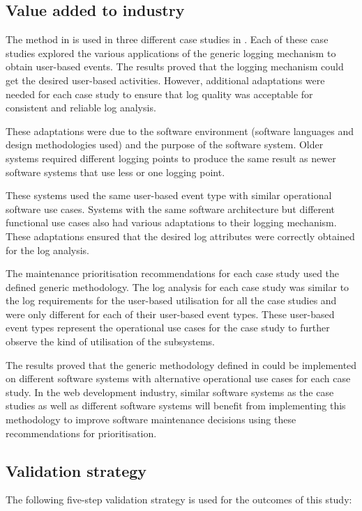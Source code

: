 \subsection{Value added to industry}
The method in  is used in three different case studies in . Each of these case studies explored the various applications of the generic logging mechanism to obtain user-based events. The results proved that the logging mechanism could get the desired user-based activities. However, additional adaptations were needed for each case study to ensure that log quality was acceptable for consistent and reliable log analysis. \par These adaptations were due to the software environment (software languages and design methodologies used) and the purpose of the software system. Older systems required different logging points to produce the same result as newer software systems that use less or one logging point. \par These systems used the same user-based event type with similar operational software use cases. Systems with the same software architecture but different functional use cases also had various adaptations to their logging mechanism. These adaptations ensured that the desired log attributes were correctly obtained for the log analysis. \par The maintenance prioritisation recommendations for each case study used the defined generic methodology. The log analysis for each case study was similar to the log requirements for the user-based utilisation for all the case studies and were only different for each of their user-based event types. These user-based event types represent the operational use cases for the case study to further observe the kind of utilisation of the subsystems. \par The results proved that the generic methodology defined in  could be implemented on different software systems with alternative operational use cases for each case study. In the web development industry, similar software systems as the case studies as well as different software systems will benefit from implementing this methodology to improve software maintenance decisions using these recommendations for prioritisation.

\subsection{Validation strategy}
The following five-step validation strategy is used for the outcomes of this study:

